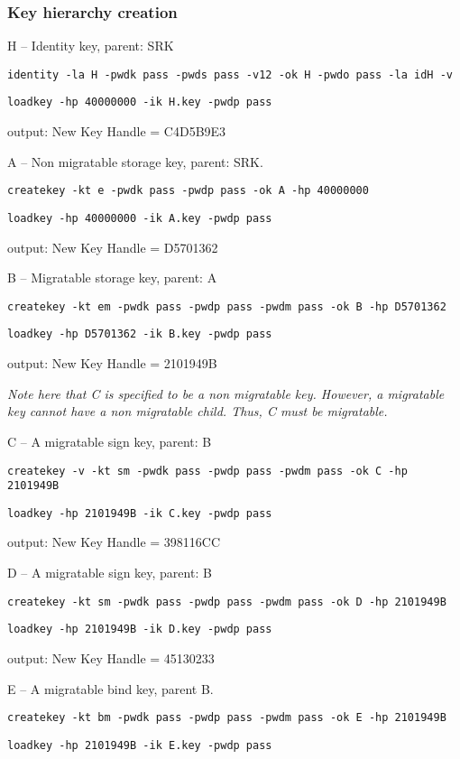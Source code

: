 \documentclass[10pt]{article}
\newcommand{\command}[1]{\texttt{#1}}
\begin{document}
    \subsubsection{Key hierarchy creation}

    H -- Identity key, parent: SRK

    \command{identity -la H -pwdk pass -pwds pass -v12 -ok H -pwdo pass -la idH -v}

    \command{loadkey -hp 40000000 -ik H.key -pwdp pass}

    output: New Key Handle = C4D5B9E3

    A -- Non migratable storage key, parent: SRK.

    \command{createkey -kt e -pwdk pass -pwdp pass -ok A -hp 40000000}

    \command{loadkey -hp 40000000 -ik A.key -pwdp pass}

    output: New Key Handle = D5701362

    B -- Migratable storage key, parent: A

    \command{createkey -kt em -pwdk pass -pwdp pass -pwdm pass -ok B -hp D5701362}

    \command{loadkey -hp D5701362 -ik B.key -pwdp pass}

    output: New Key Handle = 2101949B

    \textit{Note here that C is specified to be a non migratable key.
    However, a migratable key cannot have a non migratable child.
    Thus, C must be migratable.}

    C -- A migratable sign key, parent: B

    \command{createkey -v -kt sm -pwdk pass -pwdp pass -pwdm pass -ok C -hp 2101949B}

    \command{loadkey -hp 2101949B -ik C.key -pwdp pass}

    output: New Key Handle = 398116CC

    D -- A migratable sign key, parent: B

    \command{createkey -kt sm -pwdk pass -pwdp pass -pwdm pass -ok D -hp 2101949B}

    \command{loadkey -hp 2101949B -ik D.key -pwdp pass}

    output: New Key Handle = 45130233

    E -- A migratable bind key, parent B.

    \command{createkey -kt bm -pwdk pass -pwdp pass -pwdm pass -ok E -hp 2101949B}

    \command{loadkey -hp 2101949B -ik E.key -pwdp pass}
\end{document}
